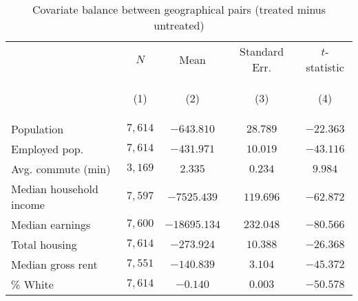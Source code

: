 \begin{table}[tbh]
        \caption{Covariate balance between geographical pairs (treated minus untreated)}
        \label{tab:paired_balance}
        \centering
        \vspace{1em}
        \begin{tabular}{lcccc}
\toprule
{} &                                       $N$ &                                      Mean &                             Standard Err. &                             $t$-statistic \\
{} & \hypertarget{tabcol:paired_balance1}{(1)} & \hypertarget{tabcol:paired_balance2}{(2)} & \hypertarget{tabcol:paired_balance3}{(3)} & \hypertarget{tabcol:paired_balance4}{(4)} \\
\midrule
Population              &                                   $7,614$ &                                $-643.810$ &                                  $28.789$ &                                 $-22.363$ \\
Employed pop.           &                                   $7,614$ &                                $-431.971$ &                                  $10.019$ &                                 $-43.116$ \\
Avg. commute (min)      &                                   $3,169$ &                                   $2.335$ &                                   $0.234$ &                                   $9.984$ \\
Median household income &                                   $7,597$ &                               $-7525.439$ &                                 $119.696$ &                                 $-62.872$ \\
Median earnings         &                                   $7,600$ &                              $-18695.134$ &                                 $232.048$ &                                 $-80.566$ \\
Total housing           &                                   $7,614$ &                                $-273.924$ &                                  $10.388$ &                                 $-26.368$ \\
Median gross rent       &                                   $7,551$ &                                $-140.839$ &                                   $3.104$ &                                 $-45.372$ \\
\% White                &                                   $7,614$ &                                  $-0.140$ &                                   $0.003$ &                                 $-50.578$ \\

\end{tabular}
\end{table}
